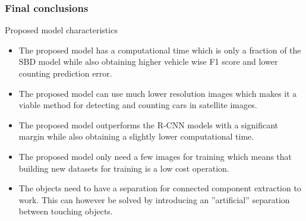 \documentclass[aspectratio=1610]{beamer}
\begin{document}
\begin{frame}
  \frametitle{\hfill Final conclusions}
	  \begin{block}{Proposed model characteristics}
    \begin{itemize}
    \item The proposed model has a computational time which is only a fraction of the SBD model while also obtaining higher vehicle wise F1 score and lower counting prediction error.
    \item The proposed model can use much lower resolution images which makes it a viable method for detecting and counting cars in satellite images.
    \item The proposed model outperforms the R-CNN models with a significant margin while also obtaining a slightly lower computational time.
    \item The proposed model only need a few images for training which means that  building new datasets for training is a low cost operation.
    \item The objects need to have a separation for connected component extraction to work. This can however be solved by introducing an ''artificial'' separation between touching objects.
    \end{itemize}
  \end{block}
\end{frame}


\begin{frame}
\printbibliography[heading=bibintoc]
\end{frame}
%
%
\end{document}
